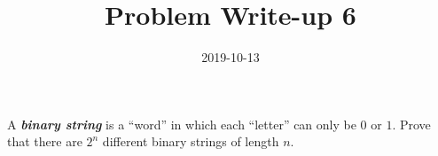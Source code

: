 \documentclass[a4paper,12pt]{article}
\title{Problem Write-up 6}
\date{2019-10-13}
\begin{document}
    \begin{problem}
        A \textbf{\textit{binary string}} is a “word” in which each “letter” can only be \(0\) or \(1\). Prove that there are \(2^n\) different binary strings of length \(n\).
    \end{problem}
    \begin{answer}
        
    \end{answer}
\end{document}
